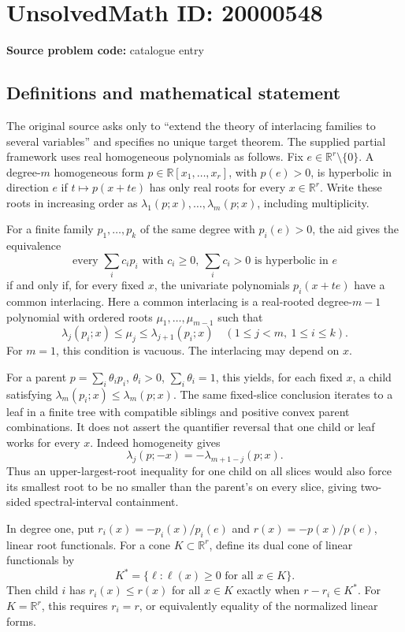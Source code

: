 \documentclass[11pt]{article}
\newcommand{\R}{\mathbb{R}}
\begin{document}
\section*{UnsolvedMath ID: 20000548}
\textbf{Source problem code:} catalogue entry
\subsection{Definitions and mathematical statement}
The original source asks only to ``extend the theory of interlacing families to several variables'' and specifies no unique target theorem. The supplied partial framework uses real homogeneous polynomials as follows. Fix \(e\in\R^r\setminus\{0\}\). A degree-\(m\) homogeneous form \(p\in\R[x_1,\ldots,x_r]\), with \(p(e)>0\), is hyperbolic in direction \(e\) if \(t\mapsto p(x+te)\) has only real roots for every \(x\in\R^r\). Write these roots in increasing order as \(\lambda_1(p;x),\ldots,\lambda_m(p;x)\), including multiplicity.

For a finite family \(p_1,\ldots,p_k\) of the same degree with \(p_i(e)>0\), the aid gives the equivalence
\[
 \text{every }\sum_i c_i p_i\text{ with }c_i\geq0,\ \sum_i c_i>0
 \text{ is hyperbolic in }e
\]
if and only if, for every fixed \(x\), the univariate polynomials \(p_i(x+te)\) have a common interlacing. Here a common interlacing is a real-rooted degree-\(m-1\) polynomial with ordered roots \(\mu_1,\ldots,\mu_{m-1}\) such that
\[
 \lambda_j(p_i;x)\leq\mu_j\leq\lambda_{j+1}(p_i;x)
 \quad(1\leq j<m,\ 1\leq i\leq k).
\]
For \(m=1\), this condition is vacuous. The interlacing may depend on \(x\).

For a parent \(p=\sum_i\theta_i p_i\), \(\theta_i>0\), \(\sum_i\theta_i=1\), this yields, for each fixed \(x\), a child satisfying \(\lambda_m(p_i;x)\leq\lambda_m(p;x)\). The same fixed-slice conclusion iterates to a leaf in a finite tree with compatible siblings and positive convex parent combinations. It does not assert the quantifier reversal that one child or leaf works for every \(x\). Indeed homogeneity gives
\[
 \lambda_j(p;-x)=-\lambda_{m+1-j}(p;x).
\]
Thus an upper-largest-root inequality for one child on all slices would also force its smallest root to be no smaller than the parent's on every slice, giving two-sided spectral-interval containment.

In degree one, put \(r_i(x)=-p_i(x)/p_i(e)\) and \(r(x)=-p(x)/p(e)\), linear root functionals. For a cone \(K\subset\R^r\), define its dual cone of linear functionals by
\[
 K^*=\{\ell:\ell(x)\geq0\text{ for all }x\in K\}.
\]
Then child \(i\) has \(r_i(x)\leq r(x)\) for all \(x\in K\) exactly when \(r-r_i\in K^*\). For \(K=\R^r\), this requires \(r_i=r\), or equivalently equality of the normalized linear forms.
\end{document}
